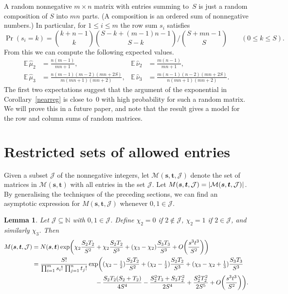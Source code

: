 \documentclass[12pt]{article}
\newtheorem{lemma}[theorem]{Lemma}
\numberwithin{equation}{section}
\def\M{{\mathcal{M}}}
\def\J{{\mathcal{J}}}
\def\svec{{\boldsymbol{s}}}
\def\tvec{{\boldsymbol{t}}}
\def\E{{\mathbb{E}}}
\def\Mst{{\M(\svec,\tvec)}}
\begin{document}
\bigskip

A random nonnegative $m\times n$ matrix with entries summing to~$S$
is just a random composition of $S$ into $mn$ parts.  (A composition
is an ordered sum of nonnegative numbers.)  
In particular, for $1\leq i\leq m$ the row sum $s_i$ satisfies
\[ \Pr(s_i = k) = \binom{k+n-1}{k}\binom{S - k + (m-1)n - 1}{S-k}
              \bigg/ \binom{S+mn-1}{S}  \quad\quad  (0\leq k\leq S).\]
{}From this we can 
compute the following expected values.
\begin{align*}
 \E\,\hat\mu_2 &= \frac{n(m-1)}{mn+1},
  & \E\,\hat\nu_2 &= \frac{m(n-1)}{mn+1}, \\
 \E\,\hat\mu_3 &= \frac{n(m-1)(m-2)(mn+2S)}{m(mn+1)(mn+2)}, &
 \E\,\hat\nu_3 &= \frac{m(n-1)(n-2)(mn+2S)}{n(mn+1)(mn+2)}.
\end{align*}
The first two expectations suggest that the argument of the
exponential in Corollary~\ref{nearreg} is close to~0 with high
probability for such a random matrix.  We will prove this in a
future paper, and note that the result gives a model for the
row and column sums of random matrices.

\section{Restricted sets of allowed entries}\label{s:restricted}

Given a subset $\J$ of the nonnegative integers,
let $\M(\svec,\tvec,\J)$ denote the set of 
matrices in $\Mst$ with all entries in the
set $\J$.  
Let $M(\svec,\tvec,\J)=\card{\M(\svec,\tvec,\J)}$.
By generalising the techniques of the preceding sections, we
can find an asymptotic expression for 
$M(\svec,\tvec,\J)$ whenever $0,1\in \J$.   

\begin{lemma} 
\label{restricted}
Let $\J\subseteq \mathbb{N}$ with $0,1\in\J$.
Define $\chi_2=0$ if\/ $2\notin\J$, $\chi_2=1$ if\/ $2\in\J$, 
and similarly $\chi_3$.
Then
\begin{align*}
 M(\svec,\tvec,\J) &= N(\svec,\tvec)
   \exp\biggl(\chi_2\frac{S_2T_2}{S^2}
             +\chi_2\frac{S_2T_2}{S^3}
             +(\chi_3-\chi_2)\frac{S_3T_3}{S^3}
             + O\biggl(\frac{s^3t^3}{S^2}\biggr)\biggr) \\
 &= \frac{S!}{\prod_{i=1}^m s_i!\, \prod_{j=1}^n t_j!}
   \exp\biggl((\chi_2-\tfrac12)\frac{S_2T_2}{S^2}
             +(\chi_2-\tfrac12)\frac{S_2T_2}{S^3}
             +(\chi_3-\chi_2+\tfrac13)\frac{S_3T_3}{S^3}\\
&\hspace{36mm}
      - \frac{S_2T_2(S_2+T_2)}{4S^4} - \frac{ S_2^2T_3+S_3T_2^2}{2S^4}
      + \frac{ S_2^2T_2^2}{2S^5} + O\biggl(\frac{s^3t^3}{S^2}\biggr)\biggr).
\end{align*}
\end{lemma}
\end{document}

